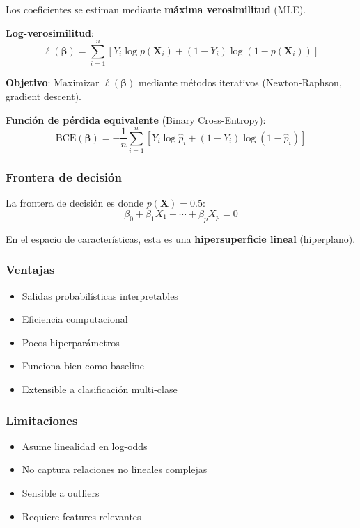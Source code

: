 \documentclass[
  doc,
  floatsintext,
  longtable,
  a4paper,
  nolmodern,
  notxfonts,
  notimes,
  12pt,
  colorlinks=true,linkcolor=blue,citecolor=blue,urlcolor=blue]{apa7}
\providecommand{\tightlist}{%
  \setlength{\itemsep}{0pt}\setlength{\parskip}{0pt}}
\begin{document}
Los coeficientes se estiman mediante \textbf{máxima verosimilitud}
(MLE).

\textbf{Log-verosimilitud}: \[
\ell(\boldsymbol{\beta}) = \sum_{i=1}^{n} \left[ Y_i \log p(\mathbf{X}_i) + (1-Y_i) \log(1-p(\mathbf{X}_i)) \right]
\]

\textbf{Objetivo}: Maximizar \(\ell(\boldsymbol{\beta})\) mediante
métodos iterativos (Newton-Raphson, gradient descent).

\textbf{Función de pérdida equivalente} (Binary Cross-Entropy): \[
\text{BCE}(\boldsymbol{\beta}) = -\frac{1}{n}\sum_{i=1}^{n} \left[ Y_i \log \hat{p}_i + (1-Y_i) \log(1-\hat{p}_i) \right]
\]

\subsubsection{Frontera de decisión}\label{frontera-de-decisiuxf3n}

La frontera de decisión es donde \(p(\mathbf{X}) = 0.5\): \[
\beta_0 + \beta_1 X_1 + \cdots + \beta_p X_p = 0
\]

En el espacio de características, esta es una \textbf{hipersuperficie
lineal} (hiperplano).

\subsubsection{Ventajas}\label{ventajas}

\begin{itemize}
\tightlist
\item
  Salidas probabilísticas interpretables
\item
  Eficiencia computacional
\item
  Pocos hiperparámetros
\item
  Funciona bien como baseline
\item
  Extensible a clasificación multi-clase
\end{itemize}

\subsubsection{Limitaciones}\label{limitaciones}

\begin{itemize}
\tightlist
\item
  Asume linealidad en log-odds
\item
  No captura relaciones no lineales complejas
\item
  Sensible a outliers
\item
  Requiere features relevantes
\end{itemize}
\end{document}
